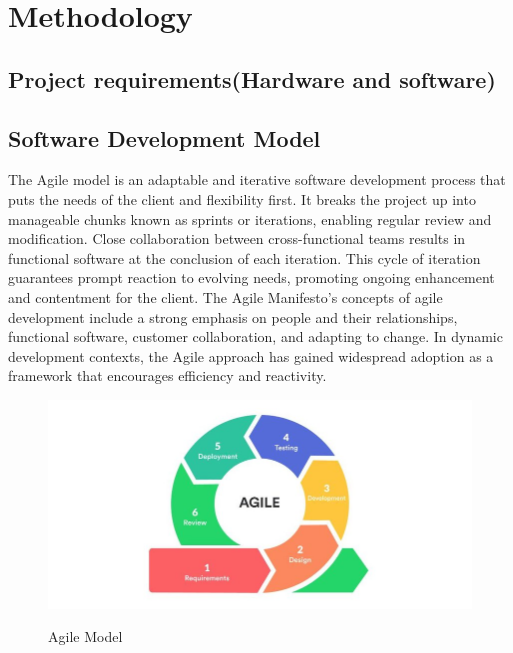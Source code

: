     \chapter{Methodology}
              
        \section{Project requirements(Hardware and software)}
        \section{Software Development Model}
 The Agile model is an adaptable and iterative software development process that puts the needs of the client and flexibility first. It breaks the project up into manageable chunks known as sprints or iterations, enabling regular review and modification. Close collaboration between cross-functional teams results in functional software at the conclusion of each iteration. This cycle of iteration guarantees prompt reaction to evolving needs, promoting ongoing enhancement and contentment for the client. The Agile Manifesto's concepts of agile development include a strong emphasis on people and their relationships, functional software, customer collaboration, and adapting to change. In dynamic development contexts, the Agile approach has gained widespread adoption as a framework that encourages efficiency and reactivity.
 \begin{figure}[h]
	\centering
	\includegraphics[scale=0.6]{img/Agile_model.png}
	\caption{Agile Model}
 \cite{google}
	\end{figure}
	
\pagebreak

	
	
	

